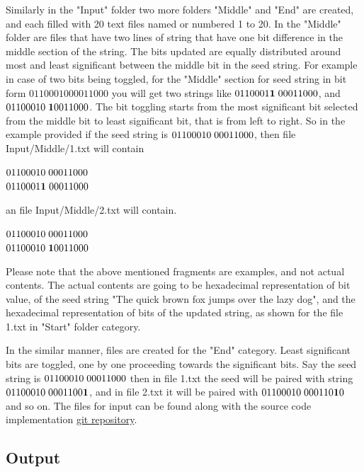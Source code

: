 Similarly in the "Input" folder two more folders "Middle" and "End" are created, and each filled with 20 text
files named or numbered 1 to 20. In the "Middle" folder are files that have two lines of string that have one
bit difference in the middle section of the string. The bits updated are equally distributed around most and least
significant between the middle bit in the seed string. For example in case of two bits being toggled, for the 
"Middle" section for seed string in bit form $01100010 00011000$ you will get two strings like $0110001{\bf 1}
\thickspace00011000$, and $01100010\thickspace{\bf 1}0011000$. The bit toggling starts from the most significant
bit selected from the middle bit to least significant bit, that is from left to right. So in the example provided
if the seed string is $01100010\thickspace00011000$, then file Input/Middle/1.txt will contain 

\begin{center}$01100010\thickspace00011000$\\
$0110001{\bf 1}\thickspace00011000$\end{center}

an file Input/Middle/2.txt will contain.

\begin{center}$01100010\thickspace00011000$\\
$01100010\thickspace{\bf 1}0011000$\end{center}

Please note that the above mentioned fragments are examples, and not actual contents. The actual contents are going
to be hexadecimal representation of bit value, of the seed string "The quick brown fox jumps over the lazy dog", and 
the hexadecimal representation of bits of the updated string, as shown for the file 1.txt in "Start" folder category.

In the similar manner, files are created for the "End" category. Least significant bits are toggled, one by one
proceeding towards the significant bits. Say the seed string is $01100010\thickspace00011000$ then in file 1.txt 
the seed will be paired with string $01100010\thickspace0001100{\bf 1}$, and in file 2.txt it will be paired with 
$01100010\thickspace000110{\bf 1}0$ and so on. The files for input can be found along with the source code 
implementation \href{"https://github.com/sxs9174/MSProjectCode/tree/master/MSProjectCode/Input"}{git repository}.

\subsection{Output}

